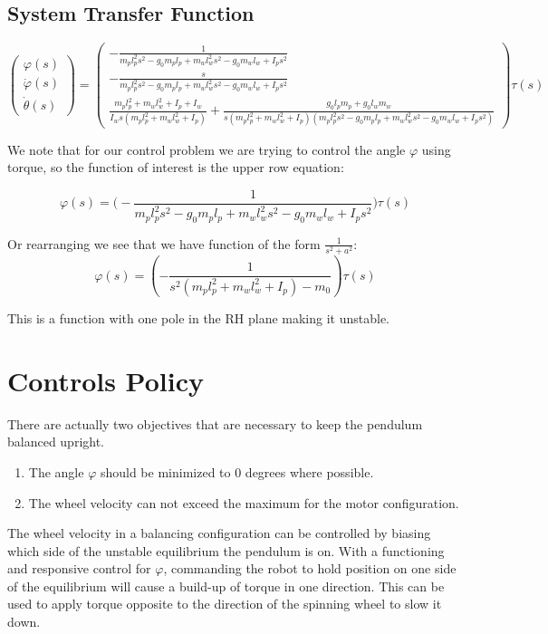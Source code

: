 \documentclass[11pt]{article}
\begin{document}
\subsection{System Transfer Function}
\[
\begin{pmatrix}
\varphi(s)\\
\dot{\varphi}(s)\\
\dot\theta(s)
\end{pmatrix}=
\begin{pmatrix}
-\frac{1}{{m_p l_p^2 s^2 - g_0 m_p l_p + m_w l_w^2 s^2 - g_0 m_w l_w + I_p s^2}} \\
-\frac{s}{{m_p l_p^2 s^2 - g_0 m_p l_p + m_w l_w^2 s^2 - g_0 m_w l_w + I_p s^2}} \\
\frac{{m_p l_p^2 + m_w l_w^2 + I_p + I_w}}{{I_w s (m_p l_p^2 + m_w l_w^2 + I_p)}} + \frac{{g_0 l_p m_p + g_0 l_w m_w}}{{s (m_p l_p^2 + m_w l_w^2 + I_p)(m_p l_p^2 s^2 - g_0 m_p l_p + m_w l_w^2 s^2 - g_0 m_w l_w + I_p s^2)}}
\end{pmatrix}
\tau(s)
\]

We note that for our control problem we are trying to control the angle $\varphi$ using torque, so the function of interest is the upper row equation:

$$ \varphi(s) = \Big(-\frac{1}{{m_p l_p^2 s^2 - g_0 m_p l_p + m_w l_w^2 s^2 - g_0 m_w l_w + I_p s^2}}\Big) \tau(s)$$

Or rearranging we see that we have function of the form $\frac{1}{s^2+a^2}$:
\[
\varphi(s) = \left(-\frac{1}{s^2(m_p l_p^2 + m_w l_w^2 + I_p) - m_0}\right) \tau(s)
\]

This is a function with one pole in the RH plane making it unstable.

\section{Controls Policy}
There are actually two objectives that are necessary to keep the pendulum balanced upright.

\begin{enumerate}
    \item The angle $\varphi$ should be minimized to 0 degrees where possible.
    \item The wheel velocity can not exceed the maximum for the motor configuration.
\end{enumerate}

The wheel velocity in a balancing configuration can be controlled by biasing which side of the unstable equilibrium the pendulum is on. With a functioning and responsive control for $\varphi$, commanding the robot to hold position on one side of the equilibrium will cause a build-up of torque in one direction. This can be used to apply torque opposite to the direction of the spinning wheel to slow it down.
\end{document}
